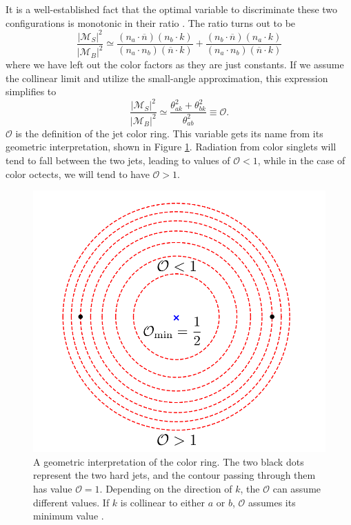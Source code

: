 \documentclass[10pt,a4paper]{book}
\begin{document}
It is a well-established fact that the optimal variable to discriminate these two configurations is monotonic in their ratio \cite{Neyman1992}. The ratio turns out to be
\begin{equation}
\frac{\vert \mathcal{M}_S \vert^2}{\vert \mathcal{M}_B \vert^2} \simeq \frac{(n_a \cdot \overline{n})(n_b \cdot k)}{(n_a \cdot n_b)(\overline{n} \cdot k)} + \frac{(n_b \cdot \overline{n})(n_a \cdot k)}{(n_a \cdot n_b)(\overline{n} \cdot k)}
\end{equation}
where we have left out the color factors as they are just constants. If we assume the collinear limit and utilize the small-angle approximation, this expression simplifies to 
\begin{equation}
\frac{\vert \mathcal{M}_S \vert^2}{\vert \mathcal{M}_B \vert^2} \simeq \frac{\theta_{ak}^2 + \theta_{bk}^2}{\theta_{ab}^2} \equiv \mathcal{O}.
\label{color ring}
\end{equation}
$\mathcal{O}$ is the definition of the jet color ring. This variable gets its name from its geometric interpretation, shown in Figure \ref{color ring geometry}. Radiation from color singlets will tend to fall between the two jets, leading to values of $\mathcal{O} < 1$, while in the case of color octects, we will tend to have $\mathcal{O} > 1$. 
\begin{figure}
\centering
\includegraphics[scale=0.3]{ch4_images/cr}
\caption{A geometric interpretation of the color ring. The two black dots represent the two hard jets, and the contour passing through them has value $\mathcal{O} = 1$. Depending on the direction of $k$, the $\mathcal{O}$ can assume different values. If $k$ is collinear to either $a$ or $b$, $\mathcal{O}$ assumes its minimum value \cite{Buckley:2020kdp}.}
\label{color ring geometry}
\end{figure}
\end{document}
